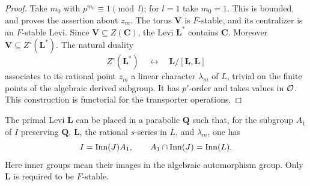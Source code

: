 \begin{proof}
Take $m_0$ with $p^{m_0}\equiv1\pmod l$; for $l=1$ take $m_0=1$.
This is bounded, and proves the assertion about $z_m$.  The torus
$\mathbf V$ is $F$-stable, and its centralizer is an $F$-stable Levi.
Since $\mathbf V\subseteq Z(\mathbf C)$, the Levi $\mathbf L^*$
contains $\mathbf C$.
Moreover $\mathbf V\subseteq Z^\circ(\mathbf L^*)$.
The natural duality
\[
 Z^\circ(\mathbf L^*)
    \quad\longleftrightarrow\quad
 \mathbf L/[\mathbf L,\mathbf L]
\]
associates to its rational point $z_m$ a linear character
$\lambda_m$ of $L$, trivial on the finite points of the algebraic
derived subgroup.  It has $p'$-order and takes values in $\mathcal O$.
This construction is functorial for the transporter operations.
\end{proof}

\begin{lemma}\label{per:parabolic}
The primal Levi $\mathbf L$ can be placed in a parabolic $\mathbf Q$
such that, for the subgroup $A_1$ of $I$ preserving $\mathbf Q$,
$\mathbf L$, the rational $s$-series in $L$, and $\lambda_m$, one has
\begin{equation}\label{per:parabolic-factorization}
 I=\operatorname{Inn}(J)A_1,\qquad A_1\cap\operatorname{Inn}(J)=\operatorname{Inn}(L).
\end{equation}
Here inner groups mean their images in the algebraic automorphism
group.  Only $\mathbf L$ is required to be $F$-stable.
\end{lemma}

